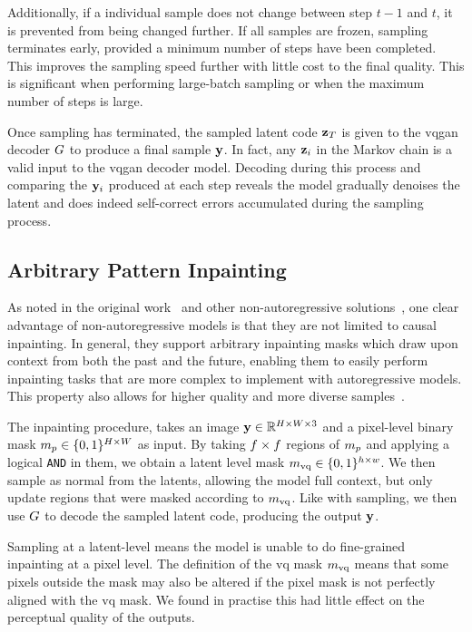 Additionally, if a individual sample does not change between step $t-1$ and $t$,
it is prevented from being changed further. If all samples are frozen, sampling
terminates early, provided a minimum number of steps have been completed. This
improves the sampling speed further with little cost to the final quality. This
is significant when performing large-batch sampling or when the maximum number
of steps is large.

Once sampling has terminated, the sampled latent code $\mathbf{z}_T$ is given
to the \gls{vqgan} decoder $G$ to produce a final sample $\mathbf{y}$. In
fact, any $\mathbf{z}_i$ in the Markov chain is a valid input to the \gls{vqgan}
decoder model. Decoding during this process and comparing the $\mathbf{y}_i$
produced at each step reveals the model gradually denoises the latent and does
indeed self-correct errors accumulated during the sampling process.

\subsection{Arbitrary Pattern Inpainting}
\label{subsec:inpainting}

As noted in the original work~\cite{savinov2022stepunrolled} and other
non-autoregressive solutions~\cite{bondtaylor2021unleashing}, one clear
advantage of non-autoregressive models is that they are not limited to causal
inpainting. In general, they support arbitrary inpainting masks which draw upon
context from both the past and the future, enabling them to easily perform
inpainting tasks that are more complex to implement with autoregressive models.
This property also allows for higher quality and more diverse
samples~\cite{bondtaylor2021unleashing}.

The inpainting procedure, takes an image $\mathbf{y} \in \mathbb{R}^{H \times
W \times 3}$ and a pixel-level binary mask $m_p \in \{0, 1\}^{H \times
W}$ as input. By taking $f \times f$ regions of
$m_p$ and applying a logical \texttt{AND} in them, we obtain a latent
level mask $m_\textrm{vq} \in \{0,1\}^{h \times w}$. We then sample as normal from the
latents, allowing the model full context, but only update regions that were
masked according to $m_\textrm{vq}$. Like with sampling, we then use $G$
to decode the sampled latent code, producing the output $\mathbf{y}$.

Sampling at a latent-level means the model is unable to do fine-grained
inpainting at a pixel level. The definition of the \gls{vq} mask $m_\textrm{vq}$ means
that some pixels outside the mask may also be altered if the pixel mask is not
perfectly aligned with the \gls{vq} mask. We found in practise this had little
effect on the perceptual quality of the outputs.
